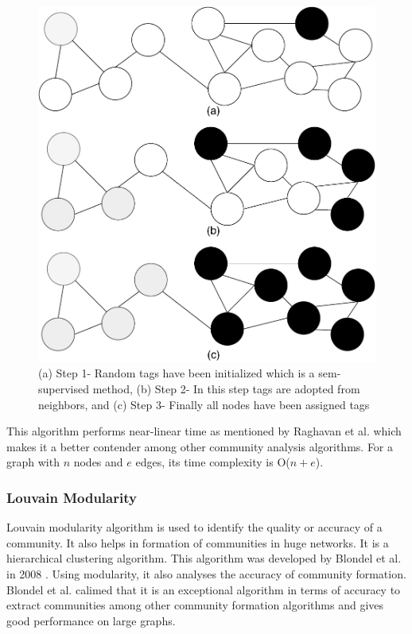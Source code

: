 \documentclass[journal,twoside,web]{ieeecolor}
\begin{document}
\begin{figure}[!h]
    \centerline{\includegraphics[scale=0.35]{figures/label_propagation.pdf}}
    \caption{(a) Step 1- Random tags have been initialized which is a sem-supervised method, (b) Step 2- In this step tags are adopted from neighbors, and (c) Step 3- Finally all nodes have been assigned tags}
    \label{fig6}
\end{figure}

This algorithm performs near-linear time as mentioned by Raghavan et al.\cite{16} which makes it a better contender among other community analysis algorithms. For a graph with $n$ nodes and $e$ edges, its time complexity is O($n + e$).

\subsubsection{Louvain Modularity}
Louvain modularity algorithm is used to identify the quality or accuracy of a community. It also helps in formation of communities in huge networks. It is a hierarchical clustering algorithm. This algorithm was developed by Blondel et al. in 2008 \cite{20}. Using modularity, it also analyses the accuracy of community formation. Blondel et al. calimed that it is an exceptional algorithm in terms of accuracy to extract communities among other community formation algorithms and gives good performance on large graphs.
\end{document}
